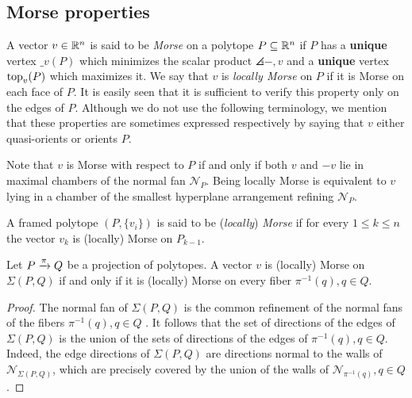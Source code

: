 
\subsection{Morse properties}



A vector $v \in \mathbb{R}^n$ is said to be \textit{Morse} on a polytope $P \subseteq \mathbb{R}^n$ if $P$ has a \textbf{unique} vertex $\bm_v(P)$ which minimizes the scalar product $\angles{-,v}$ and a \textbf{unique} vertex $\operatorname{top}_v(P)$ which maximizes it.
We say that $v$ is \textit{locally Morse} on $P$ if it is Morse on each face of $P$.
It is easily seen that it is sufficient to verify this property only on the edges of $P$.
Although we do not use the following terminology, we mention that these properties are sometimes expressed respectively by saying that $v$ either quasi-orients or orients $P$.

\begin{remark}
	Note that $v$ is Morse with respect to $P$ if and only if both $v$ and $-v$ lie in maximal chambers of the normal fan $\mathcal{N}_P$.
	Being locally Morse is equivalent to $v$ lying in a chamber of the smallest hyperplane arrangement refining $\mathcal{N}_P$.
\end{remark}



A framed polytope $(P, \{v_i\})$ is said to be (\textit{locally}) \textit{Morse} if for every $1 \leq k \leq n$ the vector $v_k$ is (locally) Morse on $P_{k-1}$.

\begin{lemma}
\label{l:orients-the-fibers}
	Let $P \xrightarrow{\pi} Q$ be a projection of polytopes.
	A vector $v$ is (locally) Morse on $\Sigma(P, Q)$ if and only if it is (locally) Morse on every fiber $\pi^{-1}(q), q \in Q$.
\end{lemma}

\begin{proof}
	The normal fan of $\Sigma(P,Q)$ is the common refinement of the normal fans of the fibers $\pi^{-1}(q), q \in Q$ \cite[Proposition 2.2]{BilleraSturmfels94}.
	It follows that the set of directions of the edges of $\Sigma(P,Q)$ is the union of the sets of directions of the edges of $\pi^{-1}(q), q \in Q$.
	Indeed, the edge directions of $\Sigma(P,Q)$ are directions normal to the walls of $\mathcal{N}_{\Sigma(P,Q)}$, which are precisely covered by the union of the walls of $\mathcal{N}_{\pi^{-1}(q)}, q \in Q$.
\end{proof}




